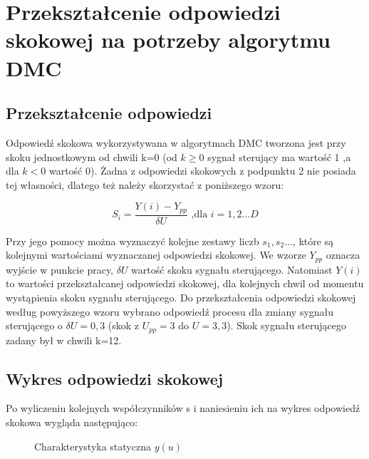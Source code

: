 \chapter{Przekształcenie odpowiedzi skokowej na potrzeby algorytmu DMC}

\section{Przekształcenie odpowiedzi}
Odpowiedź skokowa wykorzystywana w algorytmach DMC tworzona jest przy skoku jednostkowym od chwili k=0 (od $k\geq0$ sygnał sterujący ma wartość 1 ,a dla $k<0$  wartość 0).
Żadna z odpowiedzi skokowych z podpunktu 2 nie posiada tej własności, dlatego też należy skorzystać z poniższego wzoru:

\begin{equation}
S_i=\frac{Y(i)-Y_{pp}}{\delta U} \textrm{ ,dla } i=1,2 \ldots D
\label{step_norm}
\end{equation}

Przy jego pomocy można wyznaczyć kolejne zestawy liczb $s_1, s_2  \ldots$, które są kolejnymi wartościami wyznaczanej odpowiedzi skokowej. We wzorze $Y_{pp}$ oznacza wyjście w punkcie pracy, $\delta U$ wartość skoku sygnału sterującego. Natomiast $Y(i)$ to wartości przekształcanej odpowiedzi skokowej, dla kolejnych chwil od momentu wystąpienia skoku sygnału sterującego.
Do przekształcenia odpowiedzi skokowej według powyższego wzoru wybrano odpowiedź procesu dla zmiany sygnału sterującego o $\delta U=0,3$ (skok z $U_{pp}=3$ do $U=3,3$). Skok sygnału sterującego zadany był w chwili k=12.


\section{Wykres odpowiedzi skokowej}
Po wyliczeniu kolejnych współczynników s i naniesieniu ich na wykres odpowiedź skokowa wygląda następująco:


\begin{figure}[H]
\centering

\caption{Charakterystyka statyczna $y(u)$}
\end{figure}

